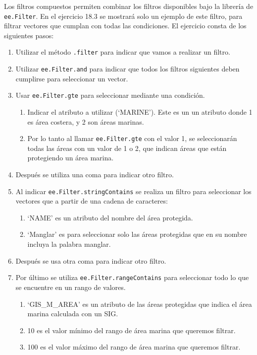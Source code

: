 \documentclass[
  12pt,
  letterpaper,
  twoside]{book}
\providecommand{\tightlist}{%
  \setlength{\itemsep}{0pt}\setlength{\parskip}{0pt}}
\begin{document}
Los filtros compuestos permiten combinar los filtros disponibles bajo la librería de \texttt{ee.Filter}. En el ejercicio 18.3 se mostrará solo un ejemplo de este filtro, para filtrar vectores que cumplan con todas las condiciones. El ejercicio consta de los siguientes pasos:

\begin{enumerate}
\def\labelenumi{\arabic{enumi}.}
\tightlist
\item
  Utilizar el método \texttt{.filter} para indicar que vamos a realizar un filtro.
\item
  Utilizar \texttt{ee.Filter.and} para indicar que todos los filtros siguientes deben cumplirse para seleccionar un vector.
\item
  Usar \texttt{ee.Filter.gte} para seleccionar mediante una condición.

  \begin{enumerate}
  \def\labelenumii{\alph{enumii}.}
  \tightlist
  \item
    Indicar el atributo a utilizar (`MARINE'). Este es un un atributo donde 1 es área costera, y 2 son áreas marinas.
  \item
    Por lo tanto al llamar \texttt{ee.Filter.gte} con el valor 1, se seleccionarán todas las áreas con un valor de 1 o 2, que indican áreas que están protegiendo un área marina.
  \end{enumerate}
\item
  Después se utiliza una coma para indicar otro filtro.
\item
  Al indicar \texttt{ee.Filter.stringContains} se realiza un filtro para seleccionar los vectores que a partir de una cadena de caracteres:

  \begin{enumerate}
  \def\labelenumii{\alph{enumii}.}
  \tightlist
  \item
    `NAME' es un atributo del nombre del área protegida.
  \item
    `Manglar' es para seleccionar solo las áreas protegidas que en su nombre incluya la palabra manglar.
  \end{enumerate}
\item
  Después se usa otra coma para indicar otro filtro.
\item
  Por último se utiliza \texttt{ee.Filter.rangeContains} para seleccionar todo lo que se encuentre en un rango de valores.

  \begin{enumerate}
  \def\labelenumii{\alph{enumii}.}
  \tightlist
  \item
    `GIS\_M\_AREA' es un atributo de las áreas protegidas que indica el área marina calculada con un SIG.
  \item
    10 es el valor mínimo del rango de área marina que queremos filtrar.
  \item
    100 es el valor máximo del rango de área marina que queremos filtrar.
  \end{enumerate}
\end{enumerate}
\end{document}

